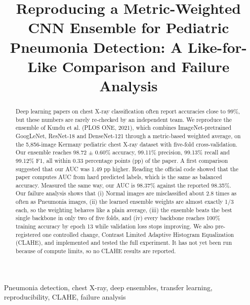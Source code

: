 \documentclass[conference]{IEEEtran}
\begin{document}
\title{Reproducing a Metric-Weighted CNN Ensemble for Pediatric Pneumonia Detection: A Like-for-Like Comparison and Failure Analysis}

\author{
\and
{}
\and
{}
}

\maketitle

\begin{abstract}
Deep learning papers on chest X-ray classification often report accuracies close to 99\%, but these numbers are rarely re-checked by an independent team. We reproduce the ensemble of Kundu et al. (PLOS ONE, 2021), which combines ImageNet-pretrained GoogLeNet, ResNet-18 and DenseNet-121 through a metric-based weighted average, on the 5,856-image Kermany pediatric chest X-ray dataset with five-fold cross-validation. Our ensemble reaches 98.72 $\pm$ 0.60\% accuracy, 99.11\% precision, 99.13\% recall and 99.12\% F1, all within 0.33 percentage points (pp) of the paper. A first comparison suggested that our AUC was 1.49 pp higher. Reading the official code showed that the paper computes AUC from hard predicted labels, which is the same as balanced accuracy. Measured the same way, our AUC is 98.37\% against the reported 98.35\%. Our failure analysis shows that (i) Normal images are misclassified about 2.8 times as often as Pneumonia images, (ii) the learned ensemble weights are almost exactly 1/3 each, so the weighting behaves like a plain average, (iii) the ensemble beats the best single backbone in only two of five folds, and (iv) every backbone reaches 100\% training accuracy by epoch 13 while validation loss stops improving. We also pre-registered one controlled change, Contrast Limited Adaptive Histogram Equalization (CLAHE), and implemented and tested the full experiment. It has not yet been run because of compute limits, so no CLAHE results are reported.
\end{abstract}

\begin{IEEEkeywords}
Pneumonia detection, chest X-ray, deep ensembles, transfer learning, reproducibility, CLAHE, failure analysis
\end{IEEEkeywords}
\end{document}
